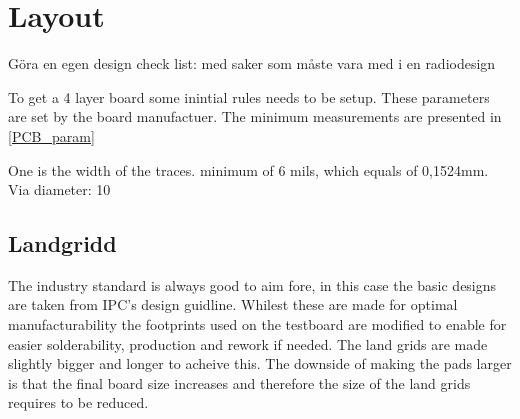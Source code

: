 \section{Layout}
Göra en egen design check list: med saker som måste vara med i en radiodesign 

To get a 4 layer board some inintial rules needs to be setup. These parameters are set by the board manufactuer. The minimum measurements are presented in \autoref{PCB_param}

One is the width of the traces. minimum of 6 mils, which equals of 0,1524mm. 
Via diameter: 10
 
\subsection{Landgridd}
The industry standard is always good to aim fore, in this case the basic designs are taken from IPC's design guidline\cite{IPC}. Whilest these are made for optimal manufacturability the footprints used on the testboard are modified to enable for easier solderability, production and rework if needed. The land grids are made slightly bigger and longer to acheive this. The downside of making the pads larger is that the final board size increases and therefore the size of the land grids requires to be reduced.